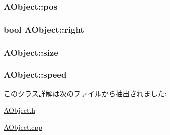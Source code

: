 \hypertarget{class_a_object_aff37fc81435924247fe0e4d7fa0186cf}{
\subsubsection[{pos\+\_\+}]{ A\+Object\+::pos\+\_\+\hspace{0.3cm}{\ttfamily [protected]}}}\label{class_a_object_aff37fc81435924247fe0e4d7fa0186cf}
\hypertarget{class_a_object_a7453abe76bbddf446aa5787231428a52}{
\subsubsection[{right}]{\setlength{\rightskip}{0pt plus 5cm}bool A\+Object\+::right\hspace{0.3cm}{\ttfamily [protected]}}}\label{class_a_object_a7453abe76bbddf446aa5787231428a52}
\hypertarget{class_a_object_a50bc88cfccd518e158096b5f033c0728}{
\subsubsection[{size\+\_\+}]{ A\+Object\+::size\+\_\+\hspace{0.3cm}{\ttfamily [protected]}}}\label{class_a_object_a50bc88cfccd518e158096b5f033c0728}
\hypertarget{class_a_object_a640b3a323c205046b20640123222cdd3}{
\subsubsection[{speed\+\_\+}]{ A\+Object\+::speed\+\_\+\hspace{0.3cm}{\ttfamily [protected]}}}\label{class_a_object_a640b3a323c205046b20640123222cdd3}


このクラス詳解は次のファイルから抽出されました\+:\begin{DoxyCompactItemize}
\item 
\hyperlink{_a_object_8h}{A\+Object.\+h}\item 
\hyperlink{_a_object_8cpp}{A\+Object.\+cpp}\end{DoxyCompactItemize}
